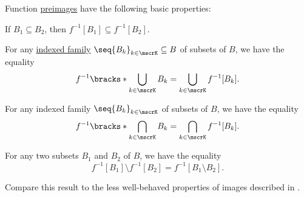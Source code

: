 \begin{proposition}\label{thm:function_preimage_properties}
  Function \hyperref[def:set_valued_map/inverse]{preimages} have the following basic properties:
  \begin{thmenum}
     If \( B_1 \subseteq B_2 \), then \( f^{-1}[B_1] \subseteq f^{-1}[B_2] \).

     For any \hyperref[def:cartesian_product/indexed_family]{indexed family} \( \seq{ B_k }_{k \in \mscrK} \subseteq B \) of subsets of \( B \), we have the equality
    \begin{equation}\label{eq:thm:function_preimage_properties/union}
      f^{-1}\bracks*{ \bigcup_{k \in \mscrK} B_k } = \bigcup_{k \in \mscrK} f^{-1}[B_k].
    \end{equation}

     For any indexed family \( \seq{ B_k }_{k \in \mscrK} \) of subsets of \( B \), we have the equality
    \begin{equation}\label{eq:thm:function_preimage_properties/intersection}
      f^{-1}\bracks*{ \bigcap_{k \in \mscrK} B_k } = \bigcap_{k \in \mscrK} f^{-1}[B_k].
    \end{equation}

     For any two subsets \( B_1 \) and \( B_2 \) of \( B \), we have the equality
    \begin{equation}\label{eq:thm:function_preimage_properties/difference}
      f^{-1}[B_1] \setminus f^{-1}[B_2] = f^{-1}[B_1 \setminus B_2].
    \end{equation}
  \end{thmenum}
\end{proposition}
\begin{comments}
  \item Compare this result to the less well-behaved properties of images described in .
\end{comments}
